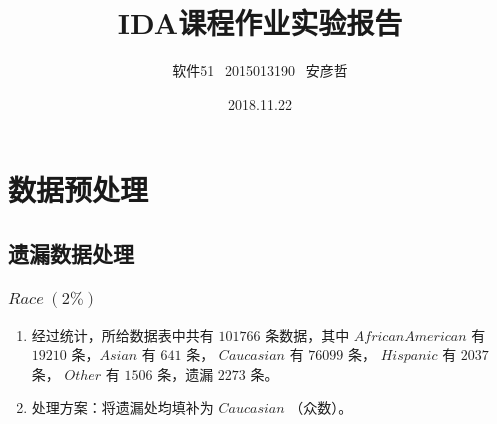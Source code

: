\documentclass[UTF8,12pt]{article} %
\begin{document}
\title{IDA课程作业实验报告}
\author{软件51$\ \ $  2015013190$\ \ $  安彦哲}
\date{2018.11.22}
\maketitle

\section{数据预处理}
\subsection{遗漏数据处理}
\subsubsection{$Race\ (2\%)$}
\begin{enumerate}[1)]
  \item 经过统计，所给数据表中共有 $101766$ 条数据，其中 $AfricanAmerican$ 有 $19210$ 条，$Asian$ 有 $641$ 条，
        $Caucasian$ 有 $76099$ 条， $Hispanic$ 有 $2037$ 条， $Other$ 有 $1506$ 条，遗漏 $2273$ 条。
  \item 处理方案：将遗漏处均填补为 $Caucasian$ （众数）。
\end{enumerate}
\end{document}

